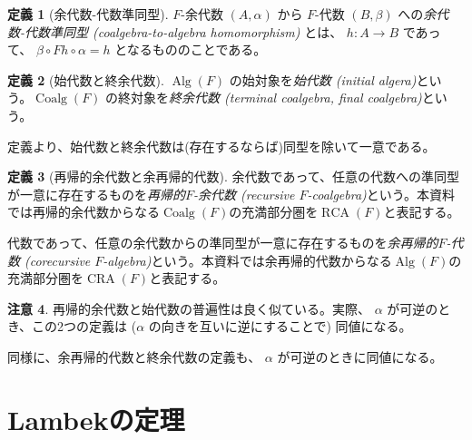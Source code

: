 \documentclass[dvipdfmx,uplatex,papersize,a4paper,10pt]{jsarticle}
\theoremstyle{definition}
\newtheorem{definition}{定義}[section]
\newtheorem{remark}[definition]{注意}
\DeclareMathOperator{\Alg}{Alg}
\DeclareMathOperator{\Coalg}{Coalg}
\DeclareMathOperator{\RCA}{RCA}
\DeclareMathOperator{\CRA}{CRA}
\begin{document}
\begin{definition}[余代数-代数準同型]
  $F$-余代数 $(A, \alpha)$ から $F$-代数 $(B, \beta)$ への\emph{余代数-代数準同型 (coalgebra-to-algebra homomorphism)} とは、 $h \colon A \to B$ であって、 $\beta \circ Fh \circ \alpha = h$ となるもののことである。

\end{definition}

\begin{definition}[始代数と終余代数]
  $\Alg(F)$ の始対象を\emph{始代数 (initial algera)}という。$\Coalg(F)$ の終対象を\emph{終余代数 (terminal coalgebra, final coalgebra)}という。

  定義より、始代数と終余代数は(存在するならば)同型を除いて一意である。
\end{definition}

\begin{definition}[再帰的余代数と余再帰的代数]

  余代数であって、任意の代数への準同型が一意に存在するものを\emph{再帰的$F$-余代数 (recursive $F$-coalgebra)}という。本資料では再帰的余代数からなる$\Coalg(F)$の充満部分圏を$\RCA(F)$と表記する。

  代数であって、任意の余代数からの準同型が一意に存在するものを\emph{余再帰的$F$-代数 (corecursive $F$-algebra)}という。本資料では余再帰的代数からなる$\Alg(F)$の充満部分圏を$\CRA(F)$と表記する。
\end{definition}

\begin{remark}
  再帰的余代数と始代数の普遍性は良く似ている。実際、 $\alpha$ が可逆のとき、この2つの定義は ($\alpha$ の向きを互いに逆にすることで) 同値になる。

  同様に、余再帰的代数と終余代数の定義も、 $\alpha$ が可逆のときに同値になる。
\end{remark}

\section{Lambekの定理}
\end{document}
